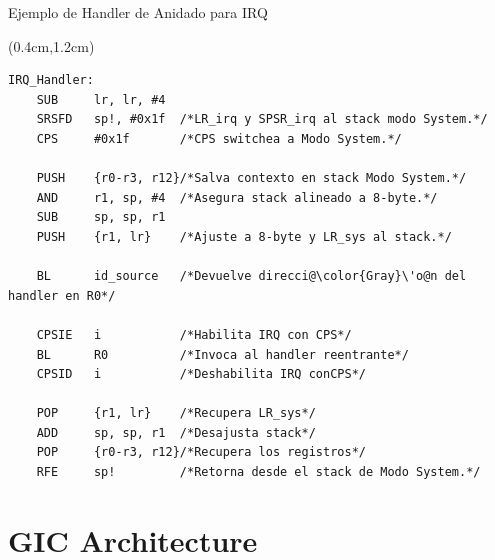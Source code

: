 \documentclass[usenames,table,xcolor={x11names},aspectratio=169]{beamer}
\begin{document}
\begin{frame}[t,fragile]{Ejemplo de Handler de Anidado para IRQ}
 \begin{textblock*}{\textwidth}(0.4cm,1.2cm)
  \begin{lstlisting}[basicstyle=\scriptsize,escapechar=\@,numbers=none, frame=single, xleftmargin=20pt, xrightmargin=0pt,]
IRQ_Handler:
    SUB     lr, lr, #4
    SRSFD   sp!, #0x1f  /*LR_irq y SPSR_irq al stack modo System.*/
    CPS     #0x1f       /*CPS switchea a Modo System.*/
    
    PUSH    {r0-r3, r12}/*Salva contexto en stack Modo System.*/
    AND     r1, sp, #4  /*Asegura stack alineado a 8-byte.*/
    SUB     sp, sp, r1
    PUSH    {r1, lr}    /*Ajuste a 8-byte y LR_sys al stack.*/
    
    BL      id_source   /*Devuelve direcci@\color{Gray}\'o@n del handler en R0*/

    CPSIE   i           /*Habilita IRQ con CPS*/
    BL      R0          /*Invoca al handler reentrante*/
    CPSID   i           /*Deshabilita IRQ conCPS*/

    POP     {r1, lr}    /*Recupera LR_sys*/
    ADD     sp, sp, r1  /*Desajusta stack*/
    POP     {r0-r3, r12}/*Recupera los registros*/
    RFE     sp!         /*Retorna desde el stack de Modo System.*/
  \end{lstlisting}
 \end{textblock*}
\end{frame}

\section{GIC Architecture}
\end{document}
